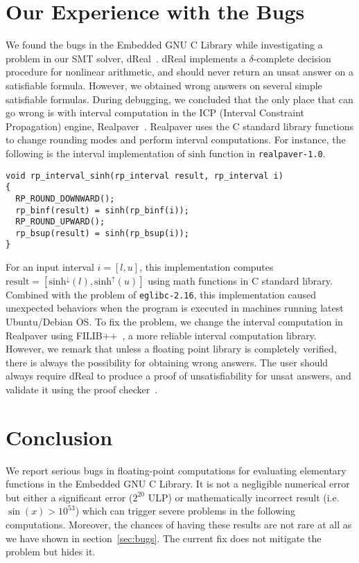 \documentclass{llncs}
\newcommand{\rup}[1]{\ensuremath{\mathrm{#1}^{\uparrow}}}
\newcommand{\rdn}[1]{\ensuremath{\mathrm{#1}^{\downarrow}}}
\begin{document}
\section{Our Experience with the Bugs}\label{sec:experience}
We found the bugs in the Embedded GNU C Library while investigating a
problem in our SMT solver, dReal~\cite{DBLP:conf/cade/GaoKC13}. dReal
implements a $\delta$-complete decision procedure for nonlinear
arithmetic, and should never return an {\sf unsat} answer on a
satisfiable formula. However, we obtained wrong answers on several
simple satisfiable formulas. During debugging, we concluded that the
only place that can go wrong is with interval computation in the ICP
(Interval Constraint Propagation) engine,
Realpaver~\cite{Granvilliers:2006:ARI:1132973.1132980}. Realpaver uses
the C standard library functions to change rounding modes and perform
interval computations. For instance, the following is the interval
implementation of $\mathrm{sinh}$ function in \texttt{realpaver-1.0}.

\begin{Verbatim}[frame=single, fontsize=\relsize{-1},
  label={\texttt{realpaver-1.0/src/rp\_interval.c}}]
void rp_interval_sinh(rp_interval result, rp_interval i)
{
  RP_ROUND_DOWNWARD();
  rp_binf(result) = sinh(rp_binf(i));
  RP_ROUND_UPWARD();
  rp_bsup(result) = sinh(rp_bsup(i));
}
\end{Verbatim}

For an input interval $i = [l, u]$, this implementation computes
$\mathrm{result} = [\rdn{sinh}(l), \rup{sinh}(u)]$ using math
functions in C standard library. Combined with the problem of
\texttt{eglibc-2.16}, this implementation caused unexpected behaviors
when the program is executed in machines running latest Ubuntu/Debian
OS. To fix the problem, we change the interval computation in
Realpaver using FILIB++~\cite{Lerch:2006:FFI:1141885.1141893}, a more
reliable interval computation library. However, we remark that unless
a floating point library is completely verified, there is always the
possibility for obtaining wrong answers. The user should always
require dReal to produce a proof of unsatisfiability for {\sf unsat}
answers, and validate it using the proof
checker~\cite{DBLP:conf/cade/GaoKC13}.

\section{Conclusion}\label{sec:conclusion}
We report serious bugs in floating-point computations for evaluating
elementary functions in the Embedded GNU C Library. It is not a
negligible numerical error but either a significant error ($2^{20}$
ULP) or mathematically incorrect result (i.e. $\sin(x) > 10^{53}$)
which can trigger severe problems in the following computations.
Moreover, the chances of having these results are not rare at all as
we have shown in section~\ref{sec:bugs}. The current fix does not
mitigate the problem but hides it.



\end{document}
